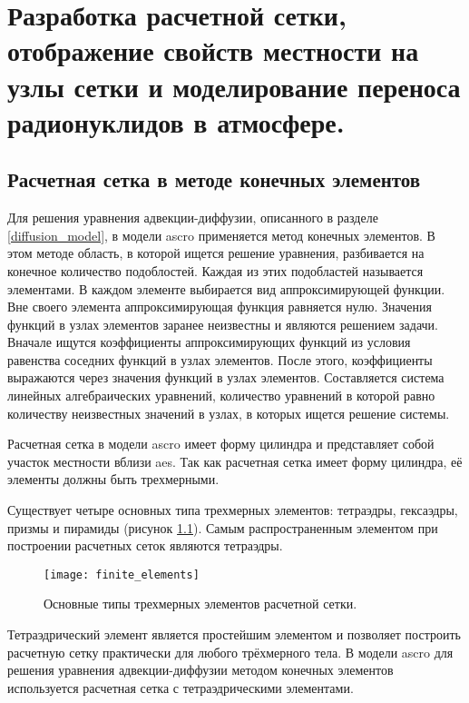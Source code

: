 \chapter{Разработка расчетной сетки, отображение свойств местности на узлы сетки и моделирование переноса радионуклидов 
в атмосфере.}
\label{chap_mesh}

\section{Расчетная сетка в методе конечных элементов}
\label{sec_fin_elem_mesh}

Для решения уравнения адвекции-диффузии, описанного в разделе \ref{diffusion_model}, в модели \ac{ascro} применяется 
метод конечных элементов. В этом методе область, в которой ищется решение уравнения, разбивается на конечное количество 
подоблостей. Каждая из этих подобластей называется элементами. В каждом элементе выбирается вид аппроксимирующей функции. 
Вне своего элемента аппроксимирующая функция равняется нулю. Значения функций в узлах элементов заранее неизвестны и 
являются решением задачи. Вначале ищутся коэффициенты аппроксимирующих функций из условия равенства соседних функций в 
узлах элементов. После этого, коэффициенты выражаются через значения функций в узлах элементов. Составляется система 
линейных алгебраических уравнений, количество уравнений в которой равно количеству неизвестных значений в узлах, в 
которых ищется решение системы. 

Расчетная сетка в модели \ac{ascro} имеет форму цилиндра и представляет собой участок местности вблизи \ac{aes}. 
Так как расчетная сетка имеет форму цилиндра, её элементы должны быть трехмерными.

Существует четыре основных типа трехмерных элементов: тетраэдры, гексаэдры, призмы и пирамиды (рисунок 
\ref{fig_finite_elements}). Самым распространенным элементом при построении расчетных сеток являются тетраэдры. 

\begin{figure}[ht]
\centering
	\texttt{[image: finite\_elements]}
	\captionsetup{justification=centering}
    \caption{Основные типы трехмерных элементов расчетной сетки.}
    \label{fig_finite_elements}
\end{figure}

Тетраэдрический элемент является простейшим элементом и позволяет построить расчетную сетку практически для любого 
трёхмерного тела. В модели \ac{ascro} для решения уравнения адвекции-диффузии методом конечных элементов используется 
расчетная сетка с тетраэдрическими элементами.

